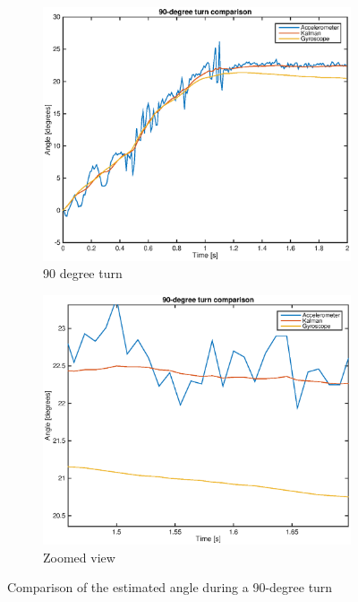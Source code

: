 \documentclass[a4paper,11pt]{kth-mag}
\begin{document}
\begin{figure}[!htb]
\centering
\begin{subfigure}{.5\textwidth}
  \centering
  \includegraphics[width=\textwidth]{Kalmanturn.eps}
  \caption{90 degree turn}
  \label{Fig: Kalmanturn}
\end{subfigure}%
\begin{subfigure}{.5\textwidth}
  \centering
  \includegraphics[width=\textwidth]{Kalmanturnzoom.eps}
  \caption{Zoomed view}
  \label{Fig: Kalmanturnzoom}
\end{subfigure}
\caption{Comparison of the estimated angle during a 90-degree turn}
\label{Fig: Kalmanturnfull}
\end{figure}
\end{document}

